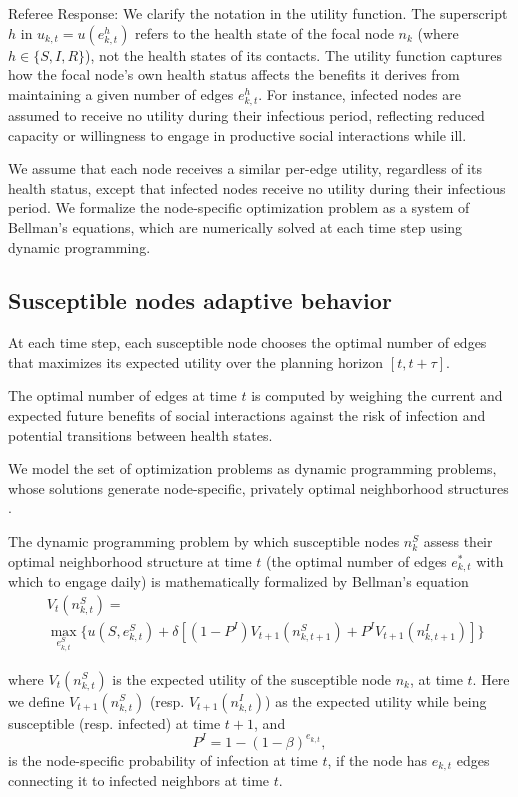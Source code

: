 \documentclass[9pt,twocolumn,twoside]{pnas-new}
\newcommand{\green}[1]{{\textcolor{green!50!black}{#1}}}
\begin{document}
\green{Referee Response: We clarify the notation in the utility function. The superscript $h$ in $u_{k,t}=u(e_{k,t}^h)$ refers to the health state of the focal node $n_k$ (where $h \in \{S,I,R\}$), not the health states of its contacts. The utility function captures how the focal node's own health status affects the benefits it derives from maintaining a given number of edges $e_{k,t}^h$. For instance, infected nodes are assumed to receive no utility during their infectious period, reflecting reduced capacity or willingness to engage in productive social interactions while ill.}

We assume that each node receives a similar per-edge utility, regardless of its health status, except that infected nodes receive no utility during their infectious period. We formalize the node-specific optimization problem as a system of Bellman's equations, which are numerically solved at each time step using dynamic programming.

\subsection*{Susceptible nodes adaptive behavior}

At each time step, each susceptible node chooses the optimal number of edges that maximizes its expected utility over the planning horizon $[t,t+\tau]$.

The optimal number of edges at time $t$ is computed by weighing the current and expected future benefits of social interactions against the risk of infection and potential transitions between health states.

We model the set of optimization problems as dynamic programming problems, whose solutions generate node-specific, privately optimal neighborhood structures \cite{fenichel2011adaptive,perrings2014merging,morin2013sir}.

The dynamic programming problem by which susceptible nodes $n_k^S$ assess their optimal neighborhood structure at time $t$ (the optimal number of edges $e_{k,t}^*$ with which to engage daily) is mathematically formalized by Bellman's equation
\begin{align} \label{eqn:bellman_snodes}
&V_{t}(n_{k,t}^S) = \nonumber \\ &\max_{e_{k,t}^S}\biggl\{u(S,e_{k,t}^S)+\delta[(1-P^I)V_{t+1}(n_{k,t+1}^S)+P^I V_{t+1}(n_{k,t+1}^I) ] \biggr\}
\end{align}

where $V_{t}(n_{k,t}^S)$ is the expected utility of the susceptible node $n_{k}$, at time $t$. Here we define $V_{t+1}(n_{k,t}^S)$ (resp. $V_{t+1}(n_{k,t}^I)$) as the expected utility while being susceptible (resp. infected) at time $t+1$, and
\begin{equation}
    P^I=1-(1-\beta)^{e_{k,t}},
\end{equation}
is the node-specific probability of infection at time $t$, if the node has $e_{k,t}$ edges connecting it to infected neighbors at time $t$.
\end{document}

